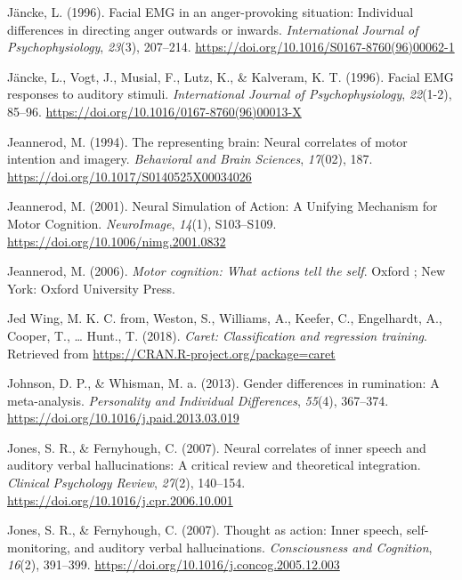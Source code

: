 \documentclass[a4paper,12pt,twoside,onecolumn,openright,final,oldfontcommands]{memoir}
\begin{document}
\leavevmode\hypertarget{ref-Jancke1996a}{}%
Jäncke, L. (1996). Facial EMG in an anger-provoking situation: Individual differences in directing anger outwards or inwards. \emph{International Journal of Psychophysiology}, \emph{23}(3), 207--214. \url{https://doi.org/10.1016/S0167-8760(96)00062-1}

\leavevmode\hypertarget{ref-Jancke1996}{}%
Jäncke, L., Vogt, J., Musial, F., Lutz, K., \& Kalveram, K. T. (1996). Facial EMG responses to auditory stimuli. \emph{International Journal of Psychophysiology}, \emph{22}(1-2), 85--96. \url{https://doi.org/10.1016/0167-8760(96)00013-X}

\leavevmode\hypertarget{ref-jeannerod_representing_1994}{}%
Jeannerod, M. (1994). The representing brain: Neural correlates of motor intention and imagery. \emph{Behavioral and Brain Sciences}, \emph{17}(02), 187. \url{https://doi.org/10.1017/S0140525X00034026}

\leavevmode\hypertarget{ref-jeannerod_neural_2001}{}%
Jeannerod, M. (2001). Neural Simulation of Action: A Unifying Mechanism for Motor Cognition. \emph{NeuroImage}, \emph{14}(1), S103--S109. \url{https://doi.org/10.1006/nimg.2001.0832}

\leavevmode\hypertarget{ref-jeannerod_motor_2006}{}%
Jeannerod, M. (2006). \emph{Motor cognition: What actions tell the self}. Oxford ; New York: Oxford University Press.

\leavevmode\hypertarget{ref-R-caret}{}%
Jed Wing, M. K. C. from, Weston, S., Williams, A., Keefer, C., Engelhardt, A., Cooper, T., \ldots{} Hunt., T. (2018). \emph{Caret: Classification and regression training}. Retrieved from \url{https://CRAN.R-project.org/package=caret}

\leavevmode\hypertarget{ref-Johnson2013}{}%
Johnson, D. P., \& Whisman, M. a. (2013). Gender differences in rumination: A meta-analysis. \emph{Personality and Individual Differences}, \emph{55}(4), 367--374. \url{https://doi.org/10.1016/j.paid.2013.03.019}

\leavevmode\hypertarget{ref-jones_neural_2007}{}%
Jones, S. R., \& Fernyhough, C. (2007). Neural correlates of inner speech and auditory verbal hallucinations: A critical review and theoretical integration. \emph{Clinical Psychology Review}, \emph{27}(2), 140--154. \url{https://doi.org/10.1016/j.cpr.2006.10.001}

\leavevmode\hypertarget{ref-Jones2007}{}%
Jones, S. R., \& Fernyhough, C. (2007). Thought as action: Inner speech, self-monitoring, and auditory verbal hallucinations. \emph{Consciousness and Cognition}, \emph{16}(2), 391--399. \url{https://doi.org/10.1016/j.concog.2005.12.003}
\end{document}

